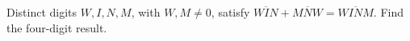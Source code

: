 Distinct digits $ W,I,N,M $, with $ W,M\ne0 $, satisfy $\overline{WIN}+\overline{MNW}=\overline{WINM}$. Find the four-digit result.
